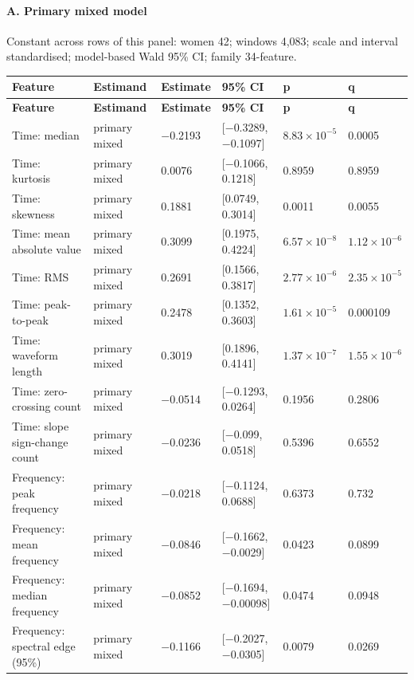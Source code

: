 \documentclass[10pt]{article}
\begin{document}
\begin{landscape}
\paragraph{A. Primary mixed model}
Constant across rows of this panel: women 42; windows 4,083; scale and interval standardised; model-based Wald 95\% CI; family 34-feature.
\begin{longtable}{p{4.4cm}p{3.6cm}p{2.0cm}p{3.6cm}p{2.0cm}p{2.0cm}}
\toprule
\textbf{Feature} & \textbf{Estimand} & \textbf{Estimate} & \textbf{95\% CI} & \textbf{p} & \textbf{q} \\
\midrule
\endfirsthead
\toprule
\textbf{Feature} & \textbf{Estimand} & \textbf{Estimate} & \textbf{95\% CI} & \textbf{p} & \textbf{q} \\
\midrule
\endhead
Time: median & primary mixed & $-$0.2193 & [$-$0.3289, $-$0.1097] & $8.83\times10^{-5}$ & 0.0005 \\
Time: kurtosis & primary mixed & 0.0076 & [$-$0.1066, 0.1218] & 0.8959 & 0.8959 \\
Time: skewness & primary mixed & 0.1881 & [0.0749, 0.3014] & 0.0011 & 0.0055 \\
Time: mean absolute value & primary mixed & 0.3099 & [0.1975, 0.4224] & $6.57\times10^{-8}$ & $1.12\times10^{-6}$ \\
Time: RMS & primary mixed & 0.2691 & [0.1566, 0.3817] & $2.77\times10^{-6}$ & $2.35\times10^{-5}$ \\
Time: peak-to-peak & primary mixed & 0.2478 & [0.1352, 0.3603] & $1.61\times10^{-5}$ & 0.000109 \\
Time: waveform length & primary mixed & 0.3019 & [0.1896, 0.4141] & $1.37\times10^{-7}$ & $1.55\times10^{-6}$ \\
Time: zero-crossing count & primary mixed & $-$0.0514 & [$-$0.1293, 0.0264] & 0.1956 & 0.2806 \\
Time: slope sign-change count & primary mixed & $-$0.0236 & [$-$0.099, 0.0518] & 0.5396 & 0.6552 \\
Frequency: peak frequency & primary mixed & $-$0.0218 & [$-$0.1124, 0.0688] & 0.6373 & 0.732 \\
Frequency: mean frequency & primary mixed & $-$0.0846 & [$-$0.1662, $-$0.0029] & 0.0423 & 0.0899 \\
Frequency: median frequency & primary mixed & $-$0.0852 & [$-$0.1694, $-$0.00098] & 0.0474 & 0.0948 \\
Frequency: spectral edge (95\%) & primary mixed & $-$0.1166 & [$-$0.2027, $-$0.0305] & 0.0079 & 0.0269 \\

\end{longtable}
\end{landscape}
\end{document}

